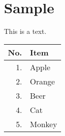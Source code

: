 \documentclass[12pt,a4paper]{article}
\begin{document}
\section{Sample}

This is a text.

\begin{tabular}{r|l}

\textbf{No.} & \textbf{Item} \\
\hline

1. & Apple \\
2. & Orange \\
3. & Beer \\
4. & Cat \\
5. & Monkey \\

\end{tabular}
\end{document}
